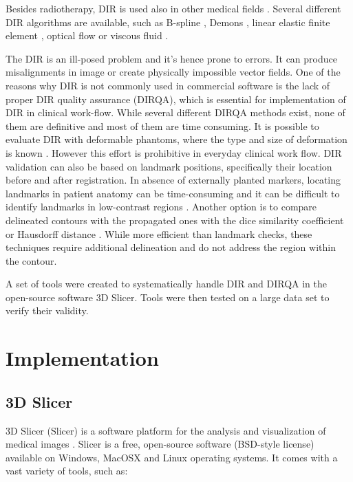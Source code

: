 Besides radiotherapy, DIR is used also in other medical fields \cite{Cleary2010, Herrell2012, Nithiananthan2011, Naini2010}.
Several different DIR algorithms are available, such as B-spline \cite{Rueckert1999}, Demons \cite{Thirion1998}, linear elastic finite element \cite{Venugopal2005}, optical flow \cite{Zhong2007} or viscous fluid \cite{Christensen1996}.
	
The DIR is an ill-posed problem and it's hence prone to errors. It can produce misalignments in image or create physically impossible vector fields. 
One of the reasons why DIR is not commonly used in commercial software is the lack of proper DIR quality assurance (DIRQA), which is essential for implementation of DIR in clinical work-flow. While several different DIRQA methods exist, none of them are definitive and most of them are time consuming. 
It is possible to evaluate DIR with deformable phantoms, where the type and size of deformation is known \cite{Kashani2007, Kirby2011}. However this effort is prohibitive 
in everyday clinical work flow. DIR validation can also be based on landmark positions, specifically their location before and after registration. In absence of externally planted markers, locating landmarks in patient 
anatomy can be time-consuming and it can be difficult to identify landmarks in low-contrast regions \cite{Varadhan2013}. Another option is to compare delineated contours with the propagated ones with the dice similarity coefficient \cite{Varadhan2013} or Hausdorff distance \cite{Huttenlocher1993}. 
While more efficient than landmark checks, these techniques require additional delineation and do not address the region within the contour.

A set of tools were created to systematically handle DIR and DIRQA in the open-source software 3D Slicer. Tools were then tested on a large data set to verify their validity.

\section{Implementation}
\label{Implementation}

\subsection{3D Slicer}
\label{Slicer}

3D Slicer (Slicer) is a software platform for the analysis and visualization of medical images \cite{Slicer, Fedorov2012}. Slicer is a free, open-source software (BSD-style license) available on Windows, MacOSX and Linux operating systems. 
It comes with a vast variety of tools, such as:

